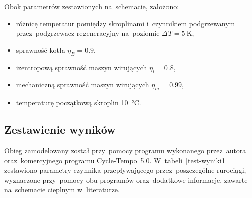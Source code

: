 Obok parametrów zestawionych na~schemacie, założono:

\begin{itemize}
	\item różnicę temperatur pomiędzy skroplinami i~czynnikiem
		podgrzewanym przez~podgrzewacz regeneracyjny na~poziomie
		$\Delta T = \SI{5}{\kelvin}$,
	\item sprawność kotła $\eta_B = \num{0,9}$,
	\item izentropową sprawność maszyn wirujących $\eta_i = \num{0,8}$,
	\item mechaniczną sprawność maszyn wirujących $\eta_m = \num{0,99}$,
	\item temperaturę początkową skroplin \SI{10}{\degreeCelsius}.
\end{itemize}


\subsection{Zestawienie wyników}

Obieg zamodelowany został przy~pomocy programu wykonanego przez~autora
oraz~komercyjnego programu Cycle-Tempo~5.0. W~tabeli~\ref{test-wyniki1}
zestawiono parametry czynnika przepływającego przez~poszczególne
rurociągi, wyznaczone przy~pomocy obu programów oraz~dodatkowe
informacje, zawarte na~schemacie cieplnym w~literaturze.

